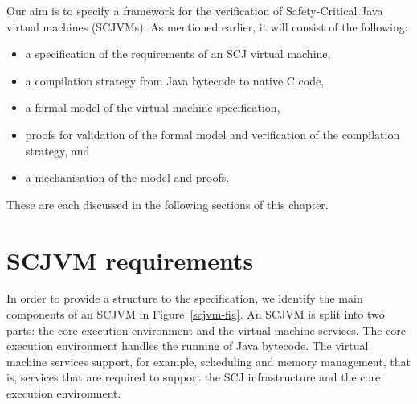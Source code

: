 \documentclass[a4paper,10pt]{report}
\begin{document}

Our aim is to specify a framework for the verification of
Safety-Critical Java virtual machines (SCJVMs).
As mentioned earlier, it will consist of the following:
\begin{itemize}
\item a specification of the requirements of an SCJ virtual machine,
\item a compilation strategy from Java bytecode to native C code,
\item a formal model of the virtual machine specification,
\item proofs for validation of the formal model and verification of
  the compilation strategy, and
\item a mechanisation of the model and proofs.
\end{itemize}
These are each discussed in the following sections of this chapter.

\section{SCJVM requirements}

In order to provide a structure to the specification, we identify the
main components of an SCJVM in Figure~\ref{scjvm-fig}.
An SCJVM is split into two parts: the core execution environment and
the virtual machine services.
The core execution environment handles the running of Java bytecode.
The virtual machine services support, for example, scheduling and
memory management, that is, services that are required to support the
SCJ infrastructure and the core execution environment.
\end{document}

